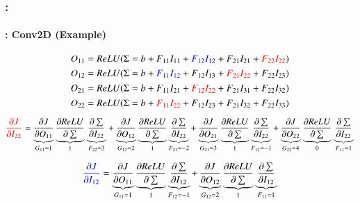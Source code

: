 \documentclass[xcolor=table]{beamer}
\begin{document}
\begin{frame}
	\frametitle{\insertshortsubtitle: \insertsection}
	\framesubtitle{\insertsubsection: Conv2D (Example)}
	
	\begin{center}
		\vskip-6pt
	\end{center}\vskip-16pt
	
	{\scriptsize 
		\[O_{11} = ReLU(\Sigma = b + F_{11} I_{11} + \textcolor{blue}{F_{12} I_{12}} + F_{21} I_{21} + \textcolor{red}{F_{22} I_{22}})  \]
		\[O_{12} = ReLU(\Sigma = b + \textcolor{blue}{F_{11} I_{12}} + F_{12} I_{13} + \textcolor{red}{F_{21} I_{22}} + F_{22} I_{23})  \]
		\[O_{21} = ReLU(\Sigma = b + F_{11} I_{21} + \textcolor{red}{F_{12} I_{22}} + F_{21} I_{31} + F_{22} I_{32})  \]
		\[O_{22} = ReLU(\Sigma = b + \textcolor{red}{F_{11} I_{22}} + F_{12} I_{23} + F_{21} I_{32} + F_{22} I_{33})  \]
		
		\[\textcolor{red}{\frac{\partial J}{\partial I_{22}}} 
		= \underbrace{\frac{\partial J}{\partial O_{11}}}_{G_{11} = 1} 
		\underbrace{\frac{\partial ReLU}{\partial \sum}}_{1} 
		\underbrace{\frac{\partial \sum}{\partial I_{22}}}_{F_{22} = 3}
		+ \underbrace{\frac{\partial J}{\partial O_{12}}}_{G_{12} = 2} 
		\underbrace{\frac{\partial ReLU}{\partial \sum}}_{1} 
		\underbrace{\frac{\partial \sum}{\partial I_{22}}}_{F_{21} = -2}
		+ \underbrace{\frac{\partial J}{\partial O_{21}}}_{G_{21} = 3} 
		\underbrace{\frac{\partial ReLU}{\partial \sum}}_{1} 
		\underbrace{\frac{\partial \sum}{\partial I_{22}}}_{F_{12} = -1}
		+ \underbrace{\frac{\partial J}{\partial O_{22}}}_{G_{22} = 4} 
		\underbrace{\frac{\partial ReLU}{\partial \sum}}_{0} 
		\underbrace{\frac{\partial \sum}{\partial I_{22}}}_{F_{11} = 1}\]
		
		\[\textcolor{blue}{\frac{\partial J}{\partial I_{12}}} 
		= \underbrace{\frac{\partial J}{\partial O_{11}}}_{G_{11} = 1} 
		\underbrace{\frac{\partial ReLU}{\partial \sum}}_{1} 
		\underbrace{\frac{\partial \sum}{\partial I_{12}}}_{F_{12} = -1}
		+ \underbrace{\frac{\partial J}{\partial O_{12}}}_{G_{12} = 2} 
		\underbrace{\frac{\partial ReLU}{\partial \sum}}_{1} 
		\underbrace{\frac{\partial \sum}{\partial I_{12}}}_{F_{11} = 1}\]
	}
	
\end{frame}
\end{document}
